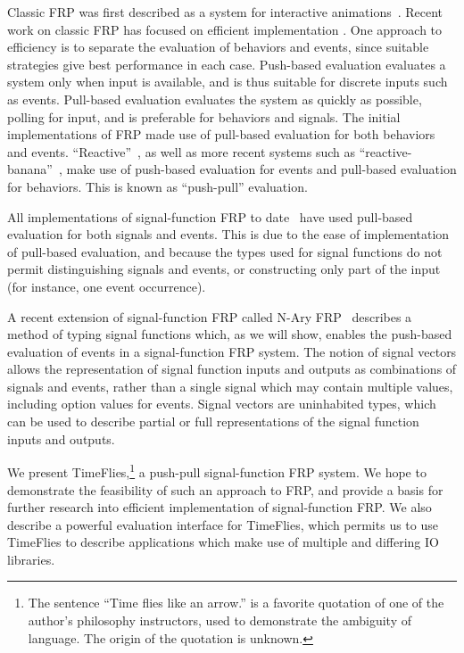 Classic FRP was first described as a system for interactive animations~\cite{Elliott1997}.
Recent work on classic FRP has focused on efficient implementation .  One approach to
efficiency is to separate the evaluation of behaviors and events, since suitable 
strategies give best performance in each case. Push-based evaluation evaluates a
system only when input is available, and is thus suitable for discrete inputs
such as events. Pull-based evaluation evaluates the system as quickly as
possible, polling for input, and is preferable for behaviors and signals.
The initial implementations of FRP made use of pull-based evaluation for both
behaviors and events. ``Reactive''~\cite{Elliott2009}, as well as more recent systems such as
``reactive-banana''~\cite{Apfelmus}, make use of push-based evaluation for
events and pull-based evaluation for behaviors. This is known as ``push-pull''
evaluation.


All implementations of signal-function FRP to date~\cite{Courtney2001-1,Nilsson2002,Nilsson2005,Sculthorpe2011}
have used pull-based evaluation for both signals and events. This is due to
the ease of implementation of pull-based evaluation, and because the types used for
signal functions do not permit distinguishing signals and events, or
constructing only part of the input (for instance, one event occurrence).


A recent extension of signal-function FRP called N-Ary FRP~\cite{Sculthorpe2011}
describes a method of typing signal functions which, as we will show, enables
the push-based evaluation of events in a signal-function FRP system. The notion
of signal vectors allows the representation of signal function inputs and
outputs as combinations of signals and events, rather than a single signal which
may contain multiple values, including option values for events. Signal vectors
are uninhabited types, which can be used to describe partial or full representations
of the signal function inputs and outputs.

We present TimeFlies,\footnote{The sentence ``Time flies like an arrow.'' is a 
favorite quotation of one of the author's philosophy instructors, used to
demonstrate the ambiguity of language. The origin of the quotation is unknown.}
a push-pull signal-function FRP system. We hope to demonstrate the feasibility
of such an approach to FRP, and provide a basis for further research into
efficient implementation of signal-function FRP. We also describe a powerful
evaluation interface for TimeFlies, which permits us to use TimeFlies to
describe applications which make use of multiple and differing IO libraries.

